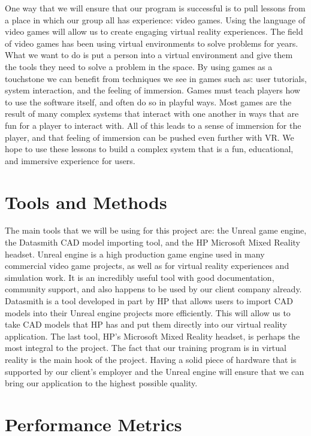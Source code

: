\documentclass[10pt,draftclsnofoot,onecolumn]{IEEEtran}
\begin{document}
\par One way that we will ensure that our program is successful is to pull lessons from a place in which our group all has experience: video games. Using the language of video games will allow us to create engaging virtual reality experiences. The field of video games has been using virtual environments to solve problems for years. What we want to do is put a person into a virtual environment and give them the tools they need to solve a problem in the space. By using games as a touchstone we can benefit from techniques we see in games such as: user tutorials, system interaction, and the feeling of immersion. Games must teach players how to use the software itself, and often do so in playful ways. Most games are the result of many complex systems that interact with one another in ways that are fun for a player to interact with. All of this leads to a sense of immersion for the player, and that feeling of immersion can be pushed even further with VR. We hope to use these lessons to build a complex system that is a fun, educational, and immersive experience for users.

\section{Tools and Methods}
\bigskip

The main tools that we will be using for this project are: the Unreal game engine, the Datasmith CAD model importing tool, and the HP Microsoft Mixed Reality headset. Unreal engine is a high production game engine used in many commercial video game projects, as well as for virtual reality experiences and simulation work. It is an incredibly useful tool with good documentation, community support, and also happens to be used by our client company already. Datasmith is a tool developed in part by HP that allows users to import CAD models into their Unreal engine projects more efficiently. This will allow us to take CAD models that HP has and put them directly into our virtual reality application. The last tool, HP's Microsoft Mixed Reality headset, is perhaps the most integral to the project. The fact that our training program is in virtual reality is the main hook of the project. Having a solid piece of hardware that is supported by our client's employer and the Unreal engine will ensure that we can bring our application to the highest possible quality. 

\section{Performance Metrics}
\bigskip
\end{document}
